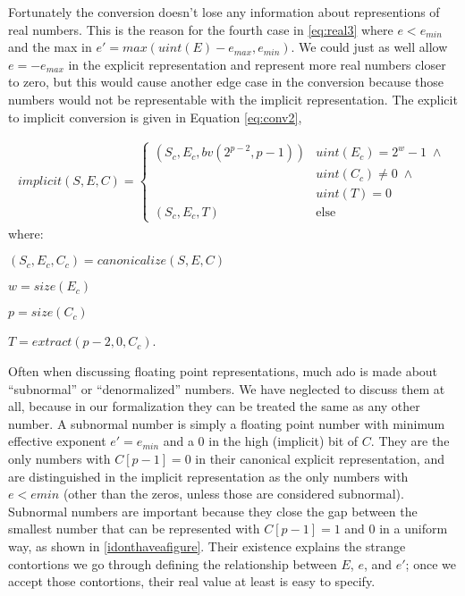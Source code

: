 \documentclass[letterpaper,10pt]{article}
\begin{document}
Fortunately the conversion doesn't lose any information about representions of real numbers. This is the reason for the fourth case in \ref{eq:real3} where $e < e_{min}$ and the max in $e' = max(uint(E) - e_{max}, e_{min})$. We could just as well allow $e = -e_{max}$ in the explicit representation and represent more real numbers closer to zero, but this would cause another edge case in the conversion because those numbers would not be representable with the implicit representation. The explicit to implicit conversion is given in Equation \ref{eq:conv2},

\begin{align} \label{eq:conv2}
 implicit(S, E, C) =
 \begin{cases}
  (S_c, E_c, bv(2^{p-2},p-1)) & uint(E_c) = 2^w - 1 \; \land \\
                              & uint(C_c) \neq 0 \; \land    \\
                              & uint(T) = 0                  \\
  (S_c, E_c, T) & \text{else}
 \end{cases}
\end{align}
where:
\begin{description}
 \item $(S_c, E_c, C_c) = canonicalize(S, E, C)$
 \item $w = size(E_c)$
 \item $p = size(C_c)$
 \item $T = extract(p-2, 0, C_c)$.
\end{description}

Often when discussing floating point representations, much ado is made about ``subnormal'' or ``denormalized'' numbers. We have neglected to discuss them at all, because in our formalization they can be treated the same as any other number. A subnormal number is simply a floating point number with minimum effective exponent $e' = e_{min}$ and a 0 in the high (implicit) bit of $C$. They are the only numbers with $C[p-1] = 0$ in their canonical explicit representation, and are distinguished in the implicit representation as the only numbers with $e < emin$ (other than the zeros, unless those are considered subnormal). Subnormal numbers are important because they close the gap between the smallest number that can be represented with $C[p-1] = 1$ and 0 in a uniform way, as shown in \ref{idonthaveafigure}. Their existence explains the strange contortions we go through defining the relationship between $E$, $e$, and $e'$; once we accept those contortions, their real value at least is easy to specify.
\end{document}
